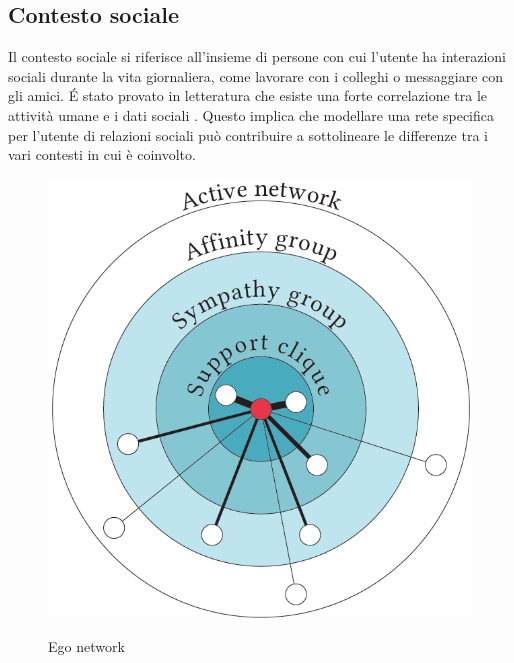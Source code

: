 \documentclass[12pt,italian]{report}
\begin{document}
\subsection{Contesto sociale} \label{subsec:social-context}
Il contesto sociale si riferisce all'insieme di persone con cui l'utente ha interazioni sociali durante la vita giornaliera, come lavorare con i colleghi o messaggiare con gli amici. \'E stato provato in letteratura che esiste una forte correlazione tra le attività umane e i dati sociali \cite{ego-net}. Questo implica che modellare una rete specifica per l'utente di relazioni sociali può contribuire a sottolineare le differenze tra i vari contesti in cui è coinvolto.

\begin{figure}
  \centering
  \includegraphics[scale=0.50]{immagini/ego-network.png}
  \caption{Ego network}
  \label{fig:ego-network}
  \cite{ego-net}
\end{figure}
\end{document}

